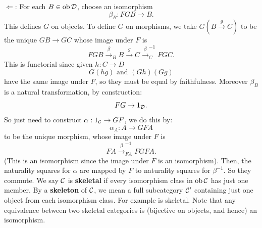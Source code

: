 \documentclass{article}
\begin{document}
$\Leftarrow$: For each $B \in \operatorname{ob} \mathcal{D}$, choose an isomorphism \[ \beta_{B} : FGB \to B. \] This defines $G$ on objects. To define $G$ on morphisms, we take $G(B \xrightarrow g C)$ to be the unique $GB \to GC$ whose image under $F$ is \[ FGB \xrightarrow \beta_{B} B \xrightarrow g C \xrightarrow \beta_{C}^{-1} FGC.\] This is functorial since given $h: C \to D$ \[ G(hg) \text{   and   } (Gh)(Gg)\] have the same image under $F$, so they must be equal by faithfulness. 
Moreover $\beta_{B}$ is a natural transformation, by construction: \[ FG \to 1_{\mathcal{D}}.\] So just need to construct $\alpha : 1_{\mathcal{C}} \to GF$, we do this by: \[ \alpha_{A} : A \to GFA \] to be the unique morphism, whose image under $F$ is \[ FA \xrightarrow \beta_{FA}^{-1} FGFA. \] (This is an isomorphism since the image under $F$ is an isomorphism). Then, the naturality squares for $\alpha$ are mapped by $F$ to naturality squares for $\beta^{-1}$. So they commute. \endproof
{} We say $\mathcal{C}$ is \textbf{skeletal} if every isomorphism class in $\operatorname{ob} \mathcal{C}$ has just one member. By a \textbf{skeleton} of $\mathcal{C}$, we mean a full subcategory $\mathcal{C}'$ containing just one object from each isomorphism class. For example  is skeletal. Note that any equivalence between two skeletal categories is (bijective on objects, and hence) an isomorphism. \gap 









\newlec 
\end{document}
